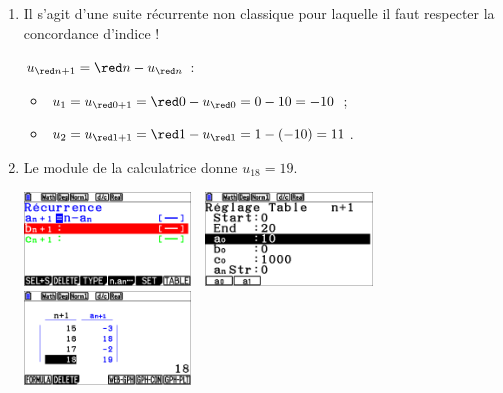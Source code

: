 \documentclass[a4paper,11pt]{article}
\begin{document}
\begin{enumerate}[itemsep=0pt]
	\item Il s'agit d'une suite récurrente \og non classique \fg{} pour laquelle il faut respecter la concordance d'indice !
	
	$u_{{\red n}+1}={\red n}-u_{{\red n}}$ :
	\begin{itemize}
		\item $u_1=u_{{\red 0}+1}={\red 0}-u_{\red 0}=0-10=-10$ ;
		\item $u_2=u_{{\red 1}+1}={\red 1}-u_{\red 1}=1-(-10)=11$.
	\end{itemize}
	\item Le module  de la calculatrice donne $u_{18}=19$.
	\begin{center}
		\includegraphics[height=2.5cm]{chap02_exos_corr_5a}~~\includegraphics[height=2.5cm]{chap02_exos_corr_5b}~~\includegraphics[height=2.5cm]{chap02_exos_corr_5c}
	\end{center}
\end{enumerate}

\medskip

\end{document}
